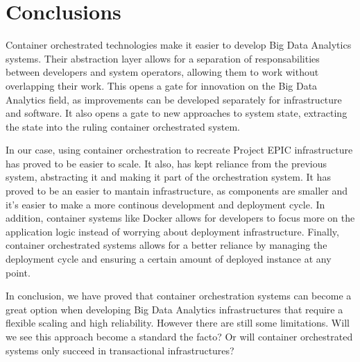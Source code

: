 
\chapter{Conclusions} %

\label{Chapter10} %

Container orchestrated technologies make it easier to develop Big Data Analytics systems. Their abstraction layer allows for a separation of responsabilities between developers and system operators, allowing them to work without overlapping their work. This opens a gate for innovation on the Big Data Analytics field, as improvements can be developed separately for infrastructure and software. It also opens a gate to new approaches to system state, extracting the state into the ruling container orchestrated system.

In our case, using container orchestration to recreate Project EPIC infrastructure has proved to be easier to scale. It also, has kept reliance from the previous system, abstracting it and making it part of the orchestration system. It has proved to be an easier to mantain infrastructure, as components are smaller and it's easier to make a more continous development and deployment cycle. In addition, container systems like Docker allows for developers to focus more on the application logic instead of worrying about deployment infrastructure. Finally, container orchestrated systems allows for a better reliance by managing the deployment cycle and ensuring a certain amount of deployed instance at any point.

In conclusion, we have proved that container orchestration systems can become a great option when developing Big Data Analytics infrastructures that require a flexible scaling and high reliability. However there are still some limitations. Will we see this approach become a standard the facto? Or will container orchestrated systems only succeed in transactional infrastructures?


